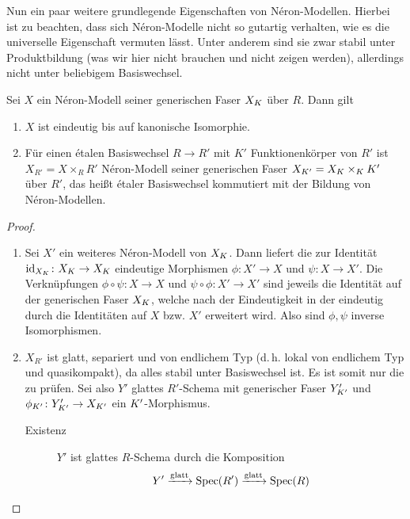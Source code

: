 Nun ein paar weitere grundlegende Eigenschaften von Néron-Modellen.
Hierbei ist zu beachten, dass sich Néron-Modelle nicht so gutartig
verhalten, wie es die universelle Eigenschaft vermuten lässt.
Unter anderem sind sie zwar stabil unter Produktbildung (was wir
hier nicht brauchen und nicht zeigen werden), allerdings nicht unter
beliebigem Basiswechsel.
\begin{Satz}
  Sei $X$ ein Néron-Modell seiner generischen Faser $X_{K}$ über
  $R$. Dann gilt
  \begin{enumerate}[label=(\roman*)]
  \item $X$ ist eindeutig bis auf kanonische Isomorphie.
  \item Für einen étalen Basiswechsel $R\to R'$ mit $K'$
    Funktionenkörper von $R'$ ist $X_{R'}=X\times_R R'$ Néron-Modell
    seiner generischen Faser $X_{K'}=X_{K}\times_{K}K'$ über $R'$,
    das heißt étaler Basiswechsel kommutiert mit der Bildung von
    Néron-Modellen.
  \end{enumerate}
  \begin{proof}
    \begin{enumerate}[label=(\roman*)]
    \item Sei $X'$ ein weiteres Néron-Modell von $X_{K}$.
      Dann liefert die \NAbbEig zur Identität
      $\mathrm{id}_{X_{K}}\colon X_{K}\to X_{K}$ eindeutige Morphismen
      $\phi\colon X'\to X$ und $\psi\colon X\to X'$.
      Die Verknüpfungen $\phi\circ\psi\colon X\to X$ und
      $\psi\circ\phi\colon X'\to X'$ sind jeweils die Identität auf
      der generischen Faser $X_{K}$, welche nach der Eindeutigkeit in der
      \NAbbEig eindeutig durch die Identitäten auf
      $X$ bzw. $X'$ erweitert wird. Also sind $\phi,\psi$ inverse
      Isomorphismen.
    \item
      $X_{R'}$ ist glatt, separiert und von endlichem Typ 
      (d.\,h. lokal von endlichem Typ und quasikompakt), da alles
      stabil unter Basiswechsel ist. Es ist somit nur die
      \NAbbEig zu prüfen.
      Sei also $Y'$ glattes $R'$-Schema mit generischer Faser
      $Y_{K'}'$ und $\phi_{K'}\colon Y_{K'}'\to X_{K'}$ ein
      $K'$-Morphismus. 
      \begin{description}
      \item[Existenz] 
        $Y'$ ist glattes $R$-Schema durch die Komposition
        \begin{gather*}
          Y'\xrightarrow{\text{glatt}}\Spec(R')
          \xrightarrow{\text{glatt}}\Spec(R)

\end{gather*}
\end{description}
\end{enumerate}
\end{proof}
\end{Satz}
